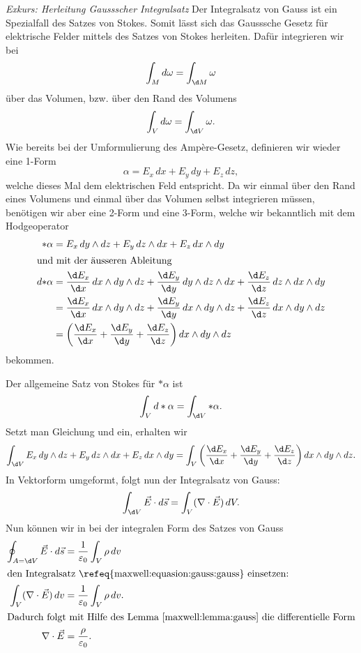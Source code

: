 \textit{Exkurs: Herleitung Gaussscher Integralsatz}
Der Integralsatz von Gauss ist ein Spezialfall des Satzes von Stokes.
Somit lässt sich das Gausssche Gesetz für elektrische Felder mittels des Satzes von Stokes herleiten.
Dafür integrieren wir bei
\[
\int_{M} d\omega
=
\int_{\d M} \omega
\]
über das Volumen, bzw. über den Rand des Volumens
\[
\int_{V} d\omega
=
\int_{\d V} \omega .
\]
Wie bereits bei der Umformulierung des Ampère-Gesetz, definieren wir wieder eine 1-Form
\[
\alpha
=
E_x \, dx + E_y \, dy + E_z \, dz ,
\]
welche dieses Mal dem elektrischen Feld entspricht.
Da wir einmal über den Rand eines Volumens und einmal über das Volumen selbst integrieren müssen, benötigen wir aber eine 2-Form und eine 3-Form, welche wir bekanntlich mit dem Hodgeoperator
\begin{align}
	\ast\alpha
	&=
	E_x \, dy \wedge dz + E_y \, dz \wedge dx + E_z \, dx \wedge dy
	\label{maxwell:equasion:gauss:zweiform}
	\\
	\intertext{und mit der äusseren Ableitung}
	d{\ast}\alpha
	&=
	\frac{\d E_x}{\d x} \, dx \wedge dy \wedge dz +
	\frac{\d E_y}{\d y} \, dy \wedge dz \wedge dx +
	\frac{\d E_z}{\d z} \, dz \wedge dx \wedge dy
	\notag
	\\ 
	&=
	\frac{\d E_x}{\d x} \, dx \wedge dy \wedge dz +
	\frac{\d E_y}{\d y} \, dx \wedge dy \wedge dz +
	\frac{\d E_z}{\d z} \, dx \wedge dy \wedge dz
	\notag
	\\
	&=
	\left(
	\frac{\d E_x}{\d x} + \frac{\d E_y}{\d y} + \frac{\d E_z}{\d z}
	\right)
	dx \wedge dy \wedge dz 
	\label{maxwell:equasion:gauss:dreiform}
\end{align}
bekommen.

Der allgemeine Satz von Stokes für $\ast \alpha$ ist
\[
\int_{V} d \ast \alpha 
=
\int_{\d V} \ast \alpha .
\]
Setzt man Gleichung  und  ein, erhalten wir
\[
\int_{\d V}
E_x \, dy \wedge dz + E_y \, dz \wedge dx + E_z \, dx \wedge dy
=
\int_{V}
\left(
\frac{\d E_x}{\d x} + \frac{\d E_y}{\d y} + \frac{\d E_z}{\d z}
\right)
dx \wedge dy \wedge dz .
\]
In Vektorform umgeformt, folgt nun der Integralsatz von Gauss:
\begin{equation}
	\label{maxwell:equasion:gauss:gauss}
	\int_{\d V}
	\vec{E} \cdot d\vec{s}
	=
	\int_{V}
	(\nabla \cdot \vec{E}) \, dV .
\end{equation}
Nun können wir in bei der integralen Form des Satzes von Gauss
\begin{align*}
	\oint_{A=\d V} \vec{E} \cdot d\vec{s}
	&=
	\frac{1}{\varepsilon_0}\int_{V} \rho \, dv
	\\
	\intertext{den Integralsatz \refeq{maxwell:equasion:gauss:gauss} einsetzen:}
	\int_{V}
	(\nabla \cdot \vec{E}) \, dv
	&=
	\frac{1}{\varepsilon_0}\int_{V} \rho \, dv .
	\\
	\intertext{Dadurch folgt mit Hilfe des Lemma \ref{maxwell:lemma:gauss} die differentielle Form}
	\nabla \cdot \vec{E}
	&=
	\frac{\rho}{\varepsilon_0}.
\end{align*} 

